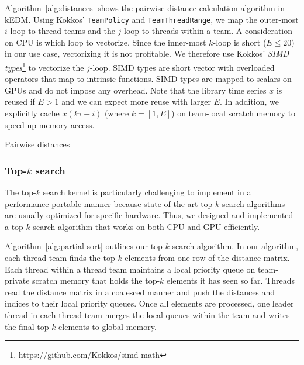 \documentclass{acmart}
\begin{document}
Algorithm~\ref{alg:distances} shows the pairwise distance calculation
algorithm in kEDM\@. Using Kokkos' \texttt{TeamPolicy} and
\texttt{TeamThreadRange}, we map the outer-most $i$-loop to thread teams and the $j$-loop to
threads within a team. A consideration on CPU is which loop to vectorize.
Since the inner-most $k$-loop is short ($E \leq 20$) in our use case,
vectorizing it is not profitable. We therefore use Kokkos'
\textit{SIMD types}\footnote{\url{https://github.com/Kokkos/simd-math}} to vectorize the
$j$-loop. SIMD types are short vector with overloaded operators that map to
intrinsic functions. SIMD types are mapped to scalars on GPUs and do not
impose any overhead. Note that the library time series $x$ is reused if $E > 1$
and we can expect more reuse with larger $E$. In addition, we explicitly cache
$x(k \tau + i)$ (where $k=[1, E]$) on team-local scratch
memory to speed up memory access.

\begin{algorithm}
    \SetAlgoLined
    \DontPrintSemicolon
    \caption{Pairwise distances}%
    \label{alg:distances}
\end{algorithm}

\subsubsection{Top-$k$ search}

The top-$k$ search kernel is particularly challenging to implement in a performance-portable manner
because state-of-the-art top-$k$ search algorithms~\cite{Johnson2019,Shanbhag2018}
are usually optimized for specific hardware. Thus, we designed and
implemented a top-$k$ search algorithm that works on both CPU and GPU
efficiently.

Algorithm~\ref{alg:partial-sort} outlines our top-$k$ search algorithm. In our algorithm, each
thread team finds the top-$k$ elements from one row of the distance matrix. Each thread within a thread team maintains a local priority queue on
team-private scratch memory that holds the top-$k$ elements it has seen so far. Threads read the distance matrix in a coalesced manner and push the distances and indices to their
local priority queues. Once all elements are processed, one leader thread in each thread team merges
the local queues within the team and writes the final top-$k$ elements to
global memory.
\end{document}
